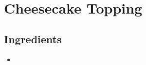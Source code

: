 \thispagestyle{fancy}
\section{Cheesecake Topping}
\AddToShipoutPicture*{\CheesecakeTopping}

\subsection*{Ingredients}
\begin{multicols}{3}
	\begin{itemize}
		\item 
	\end{itemize}
\end{multicols}